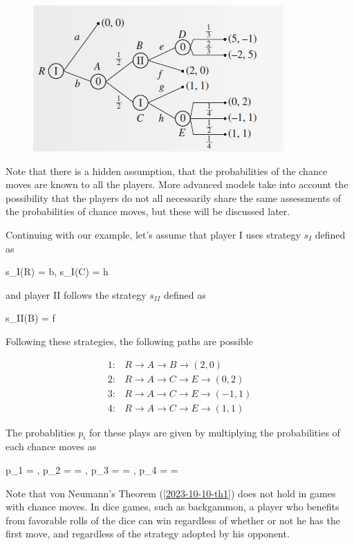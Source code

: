 \begin{figure}[H]
    \centering
    \includegraphics[scale=1.2]{images/2023-10-10-game_theory_03.png}
\end{figure}


Note that there is a hidden assumption, that the probabilities of the chance moves are known to all the players. More advanced models take into account the possibility that the players do not all necessarily share the same assessments of the probabilities of chance moves, but these will be discussed later.

Continuing with our example, let's assume that player I uses strategy $s_I$ defined as

\bee
s_I(R) = b, s_I(C) = h
\eee

and player II follows the strategy $s_{II}$ defined as

\bee
s_{II}(B) = f
\eee

Following these strategies, the following paths are possible

\begin{align*}
1:& R \rightarrow A \rightarrow B \rightarrow (2,0) \\
2:& R \rightarrow A \rightarrow C \rightarrow E \rightarrow (0,2) \\
3:& R \rightarrow A \rightarrow C \rightarrow E \rightarrow (-1,1) \\
4:& R \rightarrow A \rightarrow C \rightarrow E \rightarrow (1,1)
\end{align*}

The probablities $p_i$ for these plays are given by multiplying the probabilities of each chance moves as

\bee
p_1 = , \quad p_2 =  \cdot {} = , \quad p_3 =  \cdot  {} = , \quad p_4 =  \cdot {} = 
\eee

Note that von Neumann’s Theorem (\ref{2023-10-10-th1}) does not hold in games with chance moves. In dice games, such as backgammon, a player who benefits from favorable rolls of the dice can win regardless of whether or not he has the first move, and regardless of the strategy adopted by his opponent.

